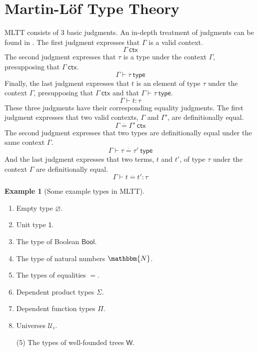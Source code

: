 \documentclass{amsart}
\theoremstyle{definition}
\newtheorem{eg}{Example}[section]
\newcommand{\N}{\mathbbm{N}}
\newcommand{\ctx}{\ensuremath{\mathsf{~ctx}}}
\newcommand{\type}{\ensuremath{\mathsf{~type}}}
\newcommand{\defeq}{\ensuremath{\overset{\boldsymbol{\cdot}}{=}}}
\newcommand{\Unit}{\ensuremath{\mathsf{1}}}
\newcommand{\Bool}{\ensuremath{\mathsf{Bool}}}
\newcommand{\W}{\ensuremath{\mathsf{W}}}
\newcommand{\U}{\ensuremath{\mathcal{U}}}
\begin{document}
\section{Martin-L\"{o}f Type Theory}
\label{sec:martin-lof-type-theory}
MLTT consists of 3 basic judgments.
An in-depth treatment of judgments can be found in \cite{ml:justif-log}.
The first judgment expresses that $\Gamma$ is a valid context.
\[
\Gamma \ctx
\]
The second judgment expresses that $\tau$ is a type under the context $\Gamma$, presupposing that $\Gamma \ctx$.
\[
\Gamma \vdash \tau \type
\]
Finally, the last judgment expresses that $t$ is an element of type $\tau$ under the context $\Gamma$, presupposing that $\Gamma \ctx$ and that $\Gamma \vdash \tau \type$.
\[
\Gamma \vdash t : \tau
\]
These three judgments have their corresponding equality judgments.
The first judgment expresses that two valid contexts, $\Gamma$ and $\Gamma'$, are definitionally equal.
\[
\Gamma \defeq \Gamma' \ctx
\]
The second judgment expresses that two types are definitionally equal under the same context $\Gamma$.
\[
\Gamma \vdash \tau \defeq \tau' \type
\]
And the last judgment expresses that two terms, $t$ and $t'$, of type $\tau$ under the context $\Gamma$ are definitionally equal.
\[
\Gamma \vdash t \defeq t' : \tau
\]
\begin{eg}[Some example types in MLTT]
\hfill
\begin{multicols}{2}
\begin{enumerate}
\item Empty type $\varnothing$.
\item Unit type $\Unit$.
\item The type of Boolean $\Bool$.
\item The type of natural numbers $\N$.
\item The types of equalities $=$.
\item Dependent product types $\Sigma$.
\item Dependent function types $\Pi$.
\item Universes $\U_{i}$.
\end{enumerate}
\end{multicols}
\vspace{-\baselineskip}
\begin{enumerate}
    \item[(5)] The types of well-founded trees $\W$. 
\end{enumerate}
\end{eg}
\end{document}
